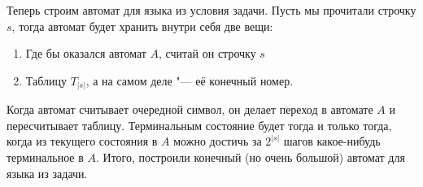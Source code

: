 	Теперь строим автомат для языка из условия задачи.
	Пусть мы прочитали строчку $s$, тогда автомат будет хранить внутри себя две вещи:
	\begin{enumerate}
		\item Где бы оказался автомат $A$, считай он строчку $s$
		\item Таблицу $T_{|s|}$, а на самом деле "--- её конечный номер.
	\end{enumerate}
	Когда автомат считывает очередной символ, он делает переход в автомате $A$ и пересчитывает таблицу.
	Терминальным состояние будет тогда и только тогда, когда из текущего состояния в $A$ можно достичь за $2^{|s|}$ шагов
	какое-нибудь терминальное в $A$.
	Итого, построили конечный (но очень большой) автомат для языка из задачи.
